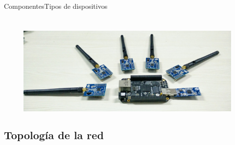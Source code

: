 \documentclass[aspectratio=169]{beamer}
\begin{document}
\begin{frame}{Componentes}{Tipos de dispositivos}
\begin{minipage}[c]{1.0\linewidth}
\begin{minipage}[c]{0.5\linewidth}
\begin{figure}
\begin{align*}
				\end{align*}\\
				\vspace{15px}
				{\includegraphics[width=.6\textwidth]{./imagenes/FFDvsRFD}}
			
		\end{figure}	  	  	  	
	\end{minipage}	
\end{minipage}
\end{frame}

\subsection[Topología]{Topología de la red}
\end{document}
